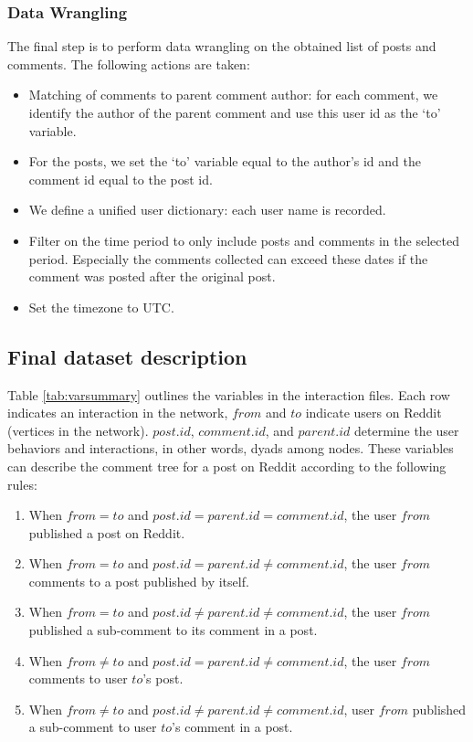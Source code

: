 \subsubsection*{Data Wrangling}
The final step is to perform data wrangling on the obtained list of posts and comments. The following actions are taken:
\begin{itemize}
	\item Matching of comments to parent comment author: for each comment, we identify the author of the parent comment and use this user id as the `to’ variable. 
	\item For the posts, we set the `to’ variable equal to the author’s id and the comment id equal to the post id.
	\item We define a unified user dictionary: each user name is recorded. 
	\item Filter on the time period to only include posts and comments in the selected period. Especially the comments collected can exceed these dates if the comment was posted after the original post. 
	\item Set the timezone to UTC. 
\end{itemize}

\subsection{Final dataset description}
%
Table \ref{tab:varsummary} outlines the variables in the interaction files. Each row indicates an interaction in the network, $from$ and $to$ indicate users on Reddit (vertices in the network). $post.id$, $comment.id$, and $parent.id$ determine the user behaviors and interactions, in other words, dyads among nodes. These variables can describe the comment tree for a post on Reddit according to the following rules:
\begin{enumerate}
	\item When $from=to$ and $post.id=parent.id=comment.id$, the user $from$ published a post on Reddit. 
	\item When $from=to$ and $post.id=parent.id \neq comment.id$, the user $from$ comments to a post published by itself. 
	\item When $from=to$ and $post.id \neq parent.id \neq comment.id$, the user $from$ published a sub-comment to its comment in a post. 
	\item When $from\neq to$ and $post.id = parent.id \neq comment.id $, the user $from$ comments to user $to$'s post. 
	\item When $from\neq to$ and $post.id \neq parent.id \neq comment.id$, user $from$ published a sub-comment to user $to$'s comment in a post. 
\end{enumerate}

